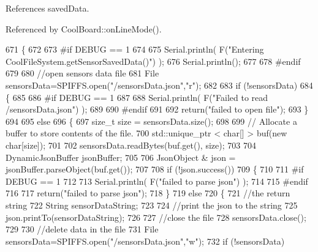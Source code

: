 References saved\+Data.



Referenced by Cool\+Board\+::on\+Line\+Mode().


\begin{DoxyCode}
671 \{
672 
673 \textcolor{preprocessor}{#if DEBUG == 1 }
674 
675     Serial.println( F(\textcolor{stringliteral}{"Entering CoolFileSystem.getSensorSavedData()"}) );
676     Serial.println();
677 
678 \textcolor{preprocessor}{#endif}
679 
680     \textcolor{comment}{//open sensors data file}
681     File sensorsData=SPIFFS.open(\textcolor{stringliteral}{"/sensorsData.json"},\textcolor{stringliteral}{"r"});
682     
683     \textcolor{keywordflow}{if} (!sensorsData)
684     \{
685 
686 \textcolor{preprocessor}{    #if DEBUG == 1 }
687 
688         Serial.println( F(\textcolor{stringliteral}{"Failed to read /sensorsData.json"}) );
689 
690 \textcolor{preprocessor}{    #endif}
691  
692         \textcolor{keywordflow}{return}(\textcolor{stringliteral}{"failed to open file"});
693     \}
694 
695     \textcolor{keywordflow}{else}
696     \{
697         \textcolor{keywordtype}{size\_t} size = sensorsData.size();
698 
699         \textcolor{comment}{// Allocate a buffer to store contents of the file.}
700         std::unique\_ptr < char[] > buf(\textcolor{keyword}{new} \textcolor{keywordtype}{char}[size]);
701 
702         sensorsData.readBytes(buf.get(), size);
703 
704         DynamicJsonBuffer jsonBuffer;
705 
706         JsonObject & json = jsonBuffer.parseObject(buf.get());
707         
708         \textcolor{keywordflow}{if} (!json.success())
709         \{
710 
711 \textcolor{preprocessor}{        #if DEBUG == 1}
712         
713             Serial.println( F(\textcolor{stringliteral}{"failed to parse json"}) );
714         
715 \textcolor{preprocessor}{        #endif}
716         
717             \textcolor{keywordflow}{return}(\textcolor{stringliteral}{"failed to parse json"});
718         \}
719         \textcolor{keywordflow}{else}
720         \{   
721             \textcolor{comment}{//the return string}
722             String sensorDataString;
723             
724             \textcolor{comment}{//print the json to the string}
725             json.printTo(sensorDataString);
726             
727             \textcolor{comment}{//close the file}
728             sensorsData.close();
729 
730             \textcolor{comment}{//delete data in the file}
731             File sensorsData=SPIFFS.open(\textcolor{stringliteral}{"/sensorsData.json"},\textcolor{stringliteral}{"w"});
732             \textcolor{keywordflow}{if} (!sensorsData)   

\end{DoxyCode}
